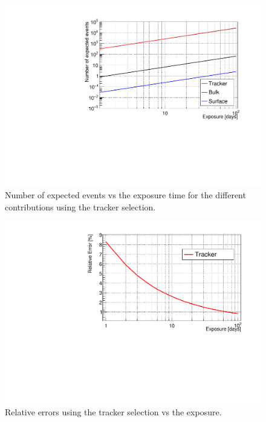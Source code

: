 \documentclass[main.tex]{subfiles}
\begin{document}
\begin{figure}[h!]
\begin{center}
\includegraphics[scale=0.5]{pictures/Chap5/nexpected_tracker_selection.pdf}
\caption{Number of expected events vs the exposure time for the different contributions using the tracker selection.}
\label{picture_number_of_expected_events_tracker_selection}
\end{center}
\end{figure}

\begin{figure}[h!]
\begin{center}
\includegraphics[scale=0.5]{pictures/Chap5/rr.pdf}
\caption{Relative errors using the tracker selection vs the exposure.}
\label{picture_relative_error_tracker_selection}
\end{center}
\end{figure}
\end{document}
